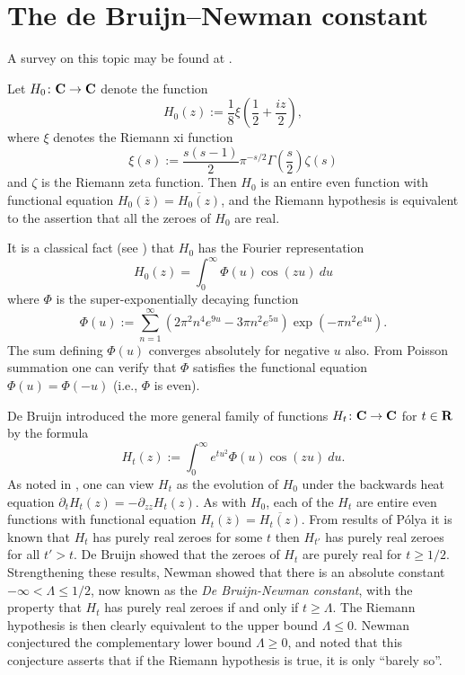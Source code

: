\chapter{The de Bruijn--Newman constant}\label{debruijn-newman-chapter}

A survey on this topic may be found at \cite{newman-wu-survey}.

Let $H_0 \colon \mathbf{C} \to \mathbf{C}$ denote the function
\begin{equation}\label{hoz}
 H_0(z) := \frac{1}{8} \xi\left(\frac{1}{2} + \frac{iz}{2}\right),
\end{equation}
where $\xi$ denotes the Riemann xi function
\begin{equation}\label{sas}
 \xi(s) := \frac{s(s-1)}{2} \pi^{-s/2} \Gamma\left(\frac{s}{2}\right) \zeta(s)
\end{equation}
and $\zeta$ is the Riemann zeta function.
Then $H_0$ is an entire even function with functional equation $H_0(\overline{z}) = \overline{H_0(z)}$, and the Riemann hypothesis is equivalent to the assertion that all the zeroes of $H_0$ are real.

It is a classical fact (see \cite[p. 255]{titch}) that $H_0$ has the Fourier representation
$$ H_0(z) = \int_0^\infty \Phi(u) \cos(zu)\ du$$
where $\Phi$ is the super-exponentially decaying function
\begin{equation}\label{phidef}
 \Phi(u) := \sum_{n=1}^\infty (2\pi^2  n^4 e^{9u} - 3\pi n^2 e^{5u} ) \exp(-\pi n^2 e^{4u} ).
\end{equation}
The sum defining $\Phi(u)$ converges absolutely for negative $u$ also.  From Poisson summation one can verify that $\Phi$ satisfies the functional equation $\Phi(u) = \Phi(-u)$ (i.e., $\Phi$ is even).

De Bruijn \cite{debr} introduced the more general family of functions $H_t \colon \mathbf{C} \to \mathbf{C}$ for $t \in \mathbf{R}$ by the formula
\begin{equation}\label{htdef}
 H_t(z) := \int_0^\infty e^{tu^2} \Phi(u) \cos(zu)\ du.
\end{equation}
As noted in \cite[p.114]{csv}, one can view $H_t$ as the evolution of $H_0$ under the backwards heat equation $\partial_t H_t(z)= -\partial_{zz} H_t(z)$.
As with $H_0$, each of the $H_t$ are entire even functions with functional equation $H_t(\overline{z}) = \overline{H_t(z)}$.  From results of P\'olya \cite{polya} it is known that $H_t$ has purely real zeroes for some $t$ then $H_{t'}$ has purely real zeroes for all $t'>t$.
De Bruijn showed that the zeroes of $H_t$ are purely real for $t \geq 1/2$.  Strengthening these results, Newman \cite{newman} showed that there is an absolute constant $-\infty < \Lambda \leq 1/2$, now known as the \emph{De Bruijn-Newman constant}, with the property that $H_t$ has purely real zeroes if and only if $t \geq \Lambda$.  The Riemann hypothesis is then clearly equivalent to the upper bound $\Lambda \leq 0$.  Newman conjectured the complementary lower bound $\Lambda \geq 0$, and noted that this conjecture asserts that if the Riemann hypothesis is true, it is only ``barely so''.

